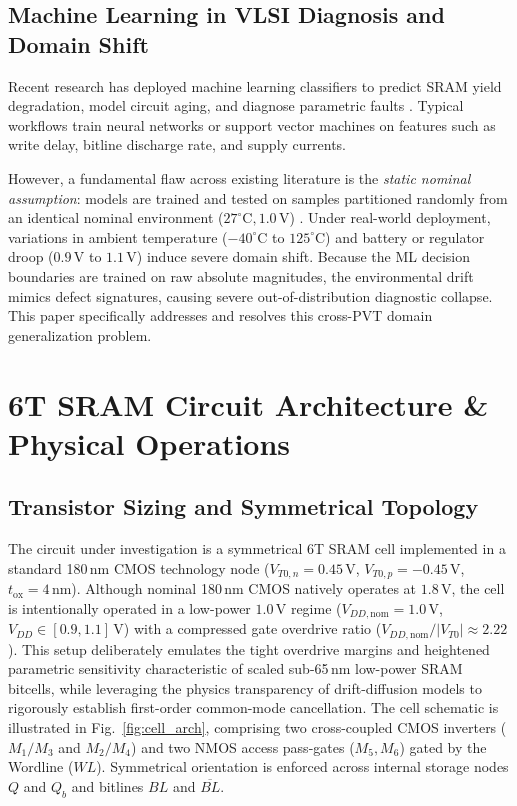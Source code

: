 \documentclass[conference]{IEEEtran}
\begin{document}
\subsection{Machine Learning in VLSI Diagnosis and Domain Shift}
Recent research has deployed machine learning classifiers to predict SRAM yield degradation, model circuit aging, and diagnose parametric faults \cite{makris2018special, amrouch2022machine, yoon2023machine, alrahis2022gnn, klemme2021machine}. Typical workflows train neural networks or support vector machines on features such as write delay, bitline discharge rate, and supply currents. 

However, a fundamental flaw across existing literature is the \textit{static nominal assumption}: models are trained and tested on samples partitioned randomly from an identical nominal environment ($27^\circ\text{C}, 1.0\,\text{V}$) \cite{mukhopadhyay2007memories}. Under real-world deployment, variations in ambient temperature ($-40^\circ\text{C}$ to $125^\circ\text{C}$) and battery or regulator droop ($0.9\,\text{V}$ to $1.1\,\text{V}$) induce severe domain shift. Because the ML decision boundaries are trained on raw absolute magnitudes, the environmental drift mimics defect signatures, causing severe out-of-distribution diagnostic collapse. This paper specifically addresses and resolves this cross-PVT domain generalization problem.


\section{6T SRAM Circuit Architecture \& Physical Operations}
\label{sec:circuit}

\subsection{Transistor Sizing and Symmetrical Topology}
The circuit under investigation is a symmetrical 6T SRAM cell implemented in a standard 180\,nm CMOS technology node ($V_{T0,n} = 0.45\,\text{V}$, $V_{T0,p} = -0.45\,\text{V}$, $t_{\text{ox}} = 4\,\text{nm}$). Although nominal 180\,nm CMOS natively operates at $1.8\,\text{V}$, the cell is intentionally operated in a low-power $1.0\,\text{V}$ regime ($V_{DD,\text{nom}} = 1.0\,\text{V}$, $V_{DD} \in [0.9, 1.1]\,\text{V}$) with a compressed gate overdrive ratio ($V_{DD,\text{nom}}/|V_{T0}| \approx 2.22$). This setup deliberately emulates the tight overdrive margins and heightened parametric sensitivity characteristic of scaled sub-65\,nm low-power SRAM bitcells, while leveraging the physics transparency of drift-diffusion models to rigorously establish first-order common-mode cancellation. The cell schematic is illustrated in Fig.~\ref{fig:cell_arch}, comprising two cross-coupled CMOS inverters ($M_1/M_3$ and $M_2/M_4$) and two NMOS access pass-gates ($M_5, M_6$) gated by the Wordline ($WL$). Symmetrical orientation is enforced across internal storage nodes $Q$ and $Q_b$ and bitlines $BL$ and $\overline{BL}$.
\end{document}
